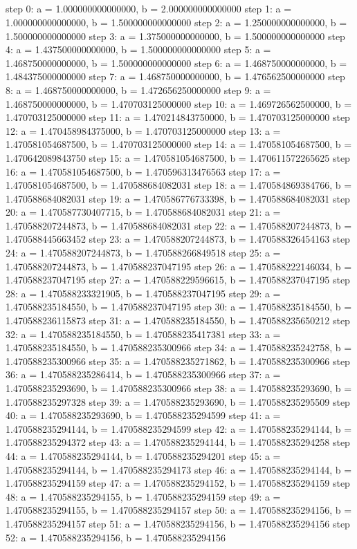 \documentclass[12pt]{article}
\begin{document}
\subsection{}

step 0:  a = 1.000000000000000, b = 2.000000000000000
step 1:  a = 1.000000000000000, b = 1.500000000000000
step 2:  a = 1.250000000000000, b = 1.500000000000000
step 3:  a = 1.375000000000000, b = 1.500000000000000
step 4:  a = 1.437500000000000, b = 1.500000000000000
step 5:  a = 1.468750000000000, b = 1.500000000000000
step 6:  a = 1.468750000000000, b = 1.484375000000000
step 7:  a = 1.468750000000000, b = 1.476562500000000
step 8:  a = 1.468750000000000, b = 1.472656250000000
step 9:  a = 1.468750000000000, b = 1.470703125000000
step 10: a = 1.469726562500000, b = 1.470703125000000
step 11: a = 1.470214843750000, b = 1.470703125000000
step 12: a = 1.470458984375000, b = 1.470703125000000
step 13: a = 1.470581054687500, b = 1.470703125000000
step 14: a = 1.470581054687500, b = 1.470642089843750
step 15: a = 1.470581054687500, b = 1.470611572265625
step 16: a = 1.470581054687500, b = 1.470596313476563
step 17: a = 1.470581054687500, b = 1.470588684082031
step 18: a = 1.470584869384766, b = 1.470588684082031
step 19: a = 1.470586776733398, b = 1.470588684082031
step 20: a = 1.470587730407715, b = 1.470588684082031
step 21: a = 1.470588207244873, b = 1.470588684082031
step 22: a = 1.470588207244873, b = 1.470588445663452
step 23: a = 1.470588207244873, b = 1.470588326454163
step 24: a = 1.470588207244873, b = 1.470588266849518
step 25: a = 1.470588207244873, b = 1.470588237047195
step 26: a = 1.470588222146034, b = 1.470588237047195
step 27: a = 1.470588229596615, b = 1.470588237047195
step 28: a = 1.470588233321905, b = 1.470588237047195
step 29: a = 1.470588235184550, b = 1.470588237047195
step 30: a = 1.470588235184550, b = 1.470588236115873
step 31: a = 1.470588235184550, b = 1.470588235650212
step 32: a = 1.470588235184550, b = 1.470588235417381
step 33: a = 1.470588235184550, b = 1.470588235300966
step 34: a = 1.470588235242758, b = 1.470588235300966
step 35: a = 1.470588235271862, b = 1.470588235300966
step 36: a = 1.470588235286414, b = 1.470588235300966
step 37: a = 1.470588235293690, b = 1.470588235300966
step 38: a = 1.470588235293690, b = 1.470588235297328
step 39: a = 1.470588235293690, b = 1.470588235295509
step 40: a = 1.470588235293690, b = 1.470588235294599
step 41: a = 1.470588235294144, b = 1.470588235294599
step 42: a = 1.470588235294144, b = 1.470588235294372
step 43: a = 1.470588235294144, b = 1.470588235294258
step 44: a = 1.470588235294144, b = 1.470588235294201
step 45: a = 1.470588235294144, b = 1.470588235294173
step 46: a = 1.470588235294144, b = 1.470588235294159
step 47: a = 1.470588235294152, b = 1.470588235294159
step 48: a = 1.470588235294155, b = 1.470588235294159
step 49: a = 1.470588235294155, b = 1.470588235294157
step 50: a = 1.470588235294156, b = 1.470588235294157
step 51: a = 1.470588235294156, b = 1.470588235294156
step 52: a = 1.470588235294156, b = 1.470588235294156
\end{document}
